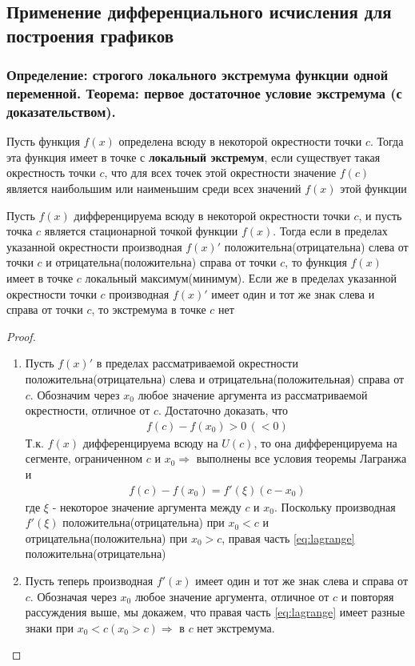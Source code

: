 \documentclass[10pt]{article}
\begin{document}
    \subsection{Применение дифференциального исчисления для построения графиков}
    \subsubsection{Определение: строгого локального экстремума функции одной переменной. Теорема: первое достаточное условие экстремума (с доказательством).}
    \begin{definition}
        Пусть функция $f(x)$ определена всюду в некоторой окрестности точки $c$. Тогда эта функция имеет в точке с \textbf{локальный экстремум}, если существует такая окрестность точки $c$, что для всех точек этой окрестности значение $f(c)$ является наибольшим или наименьшим среди всех значений $f(x)$ этой функции
    \end{definition}
    \begin{theorem}
        Пусть $f(x)$ дифференцируема всюду в некоторой окрестности точки $c$, и пусть точка $c$ является стационарной точкой функции $f(x)$. Тогда если в пределах указанной окрестности производная $f(x)'$ положительна(отрицательна) слева от точки $c$ и отрицательна(положительна) справа от точки $c$, то функция $f(x)$ имеет в точке $c$ локальный максимум(минимум). Если же в пределах указанной окрестности точки $c$ производная $f(x)'$ имеет один и тот же знак слева и справа от точки $c$, то экстремума в точке $c$ нет
    \end{theorem}
    \begin{proof}
        \begin{enumerate}
            \item Пусть $f(x)'$ в пределах рассматриваемой окрестности положительна(отрицательна) слева и отрицательна(положительная) справа от $c$. Обозначим через $x_0$ любое значение аргумента из рассматриваемой окрестности, отличное от $c$. Достаточно доказать, что
            \begin{gather*}
                f(c)-f(x_0)>0\,(<0)
            \end{gather*}
            Т.к. $f(x)$ дифференцируема всюду на $U(c)$, то она дифференцируема на сегменте, ограниченном $c$ и $x_0 \Rightarrow$ выполнены все условия теоремы Лагранжа и
            \begin{gather}
                f(c) - f(x_0) = f'(\xi)(c-x_0)\label{eq:lagrange}
            \end{gather}
            где $\xi$ - некоторое значение аргумента между $c$ и $x_0$. Поскольку производная $f'(\xi)$ положительна(отрицательна) при $x_0 < c$ и отрицательна(положительна) при $x_0 > c$, правая часть \ref{eq:lagrange} положительна(отрицательна)
            \item Пусть теперь производная $f'(x)$ имеет один и тот же знак слева и справа от $c$. Обозначая через $x_0$ любое значение аргумента, отличное от $c$ и повторяя рассуждения выше, мы докажем, что правая часть \ref{eq:lagrange} имеет разные знаки при $x_0 < c(x_0 > c) \Rightarrow$ в $c$ нет экстремума.
        \end{enumerate}
    \end{proof}
\end{document}
